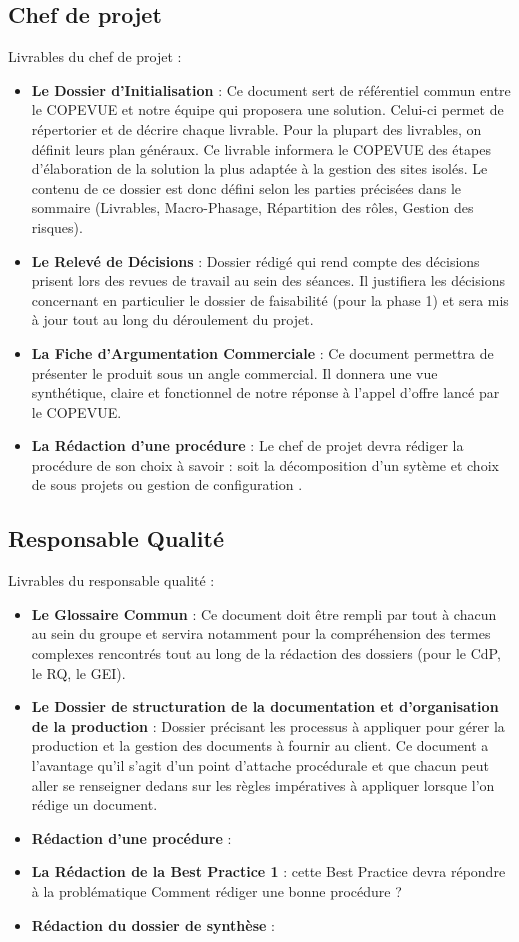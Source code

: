     \subsection{Chef de projet}
Livrables du chef de projet :
\begin{itemize}
\item \textbf{Le Dossier d'Initialisation} : Ce document sert de référentiel commun entre le COPEVUE et notre équipe qui proposera une solution. Celui-ci permet de répertorier et de décrire chaque livrable. Pour la plupart des livrables, on définit leurs plan généraux. Ce livrable informera le COPEVUE des étapes d’élaboration de la solution la plus adaptée à la gestion des sites isolés. Le contenu de ce dossier est donc défini selon les parties précisées dans le sommaire (Livrables, Macro-Phasage, Répartition des rôles, Gestion des risques).
\item \textbf{Le Relevé de Décisions} : Dossier rédigé qui rend compte des décisions prisent lors des revues de travail au sein des séances. Il justifiera les décisions concernant en particulier le dossier de faisabilité (pour la phase 1) et sera mis à jour tout au long du déroulement du projet.
\item \textbf{La Fiche d'Argumentation Commerciale} : Ce document permettra de présenter le produit sous un angle commercial. Il donnera une vue synthétique, claire et fonctionnel de notre réponse à l'appel d'offre lancé par le COPEVUE.
\item \textbf{La Rédaction d'une procédure} : Le chef de projet devra rédiger la procédure de son choix à savoir : soit la \og décomposition d'un sytème et choix de sous projets \fg ou \og gestion de configuration \fg.
\end{itemize}

    \subsection{Responsable Qualité}
Livrables du responsable qualité :   
\begin{itemize}
\item \textbf{Le Glossaire Commun} : Ce document doit être rempli par tout à chacun au sein du groupe et servira notamment pour la compréhension des termes complexes rencontrés tout au long de la rédaction des dossiers (pour le CdP, le RQ, le GEI).
\item \textbf{Le Dossier de structuration de la documentation et d'organisation de la production} : Dossier précisant les processus à appliquer pour gérer la production et la gestion des documents à fournir au client. Ce document a l'avantage qu'il s'agit d'un point d'attache procédurale et que chacun peut aller se renseigner dedans sur les règles impératives à appliquer lorsque l'on rédige un document.
\item \textbf{Rédaction d'une procédure} : 
\item \textbf{La Rédaction de la Best Practice 1} : cette Best Practice devra répondre à la problématique \og Comment rédiger une bonne procédure ?\fg
\item \textbf{Rédaction du dossier de synthèse} :
\end{itemize}

